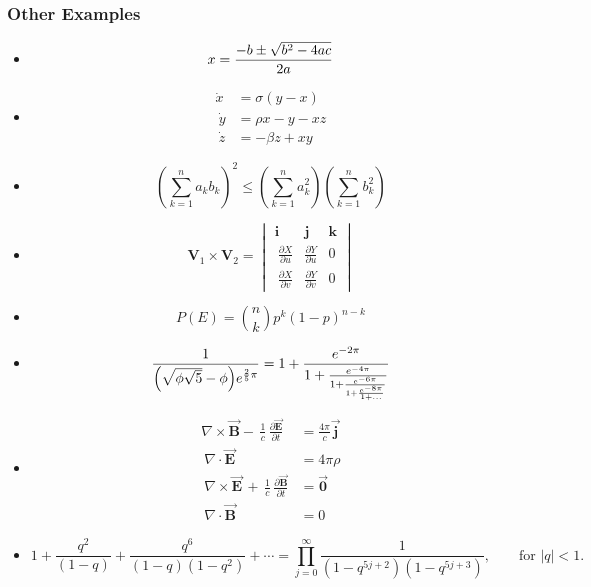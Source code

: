 \documentclass[]{article}
\providecommand{\tightlist}{%
  \setlength{\itemsep}{0pt}\setlength{\parskip}{0pt}}
\begin{document}
\subsubsection{Other Examples}\label{other-examples}

\begin{itemize}
\tightlist
\item
  \[x = {-b \pm \sqrt{b^2-4ac} \over 2a}\]
\item
  \[
  \begin{aligned}
  \dot{x} & = \sigma(y-x) \\\
  \dot{y} & = \rho x - y - xz \\\
  \dot{z} & = -\beta z + xy
  \end{aligned}
  \]
\item
  \[\left( \sum_{k=1}^n a_k b_k \right)^2 \leq \left( \sum_{k=1}^n a_k^2 \right) \left( \sum_{k=1}^n b_k^2 \right)\]
\item
  \[\mathbf{V}_1 \times \mathbf{V}_2 =  \begin{vmatrix}
  \mathbf{i} & \mathbf{j} & \mathbf{k} \\\
  \frac{\partial X}{\partial u} &  \frac{\partial Y}{\partial u} & 0 \\\
  \frac{\partial X}{\partial v} &  \frac{\partial Y}{\partial v} & 0
  \end{vmatrix}\]
\item
  \[P(E) = {n \choose k} p^k (1-p)^{n-k}\]
\item
  \[\frac{1}{\Bigl(\sqrt{\phi \sqrt{5}}-\phi\Bigr) e^{\frac25 \pi}} =
  1+\frac{e^{-2\pi}} {1+\frac{e^{-4\pi}} {1+\frac{e^{-6\pi}}
  {1+\frac{e^{-8\pi}} {1+\ldots} } } }\]
\item
  \[
  \begin{aligned}
  \nabla \times \vec{\mathbf{B}} -\, \frac1c\, \frac{\partial\vec{\mathbf{E}}}{\partial t} & = \frac{4\pi}{c}\vec{\mathbf{j}} \\\
  \nabla \cdot \vec{\mathbf{E}} & = 4 \pi \rho \\\
  \nabla \times \vec{\mathbf{E}}\, +\, \frac1c\, \frac{\partial\vec{\mathbf{B}}}{\partial t} & = \vec{\mathbf{0}} \\\
  \nabla \cdot \vec{\mathbf{B}} & = 0 \end{aligned}
  \]
\item
  \[1 +  \frac{q^2}{(1-q)}+\frac{q^6}{(1-q)(1-q^2)}+\cdots =
  \prod_{j=0}^{\infty}\frac{1}{(1-q^{5j+2})(1-q^{5j+3})},
  \quad\quad \text{for $|q|<1$}.\]
\end{itemize}
\end{document}
